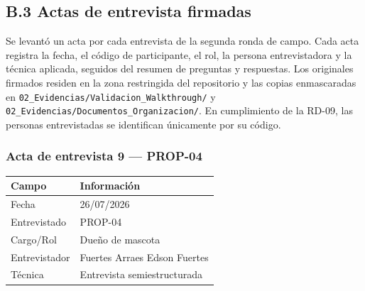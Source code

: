 \documentclass[journal,onecolumn]{IEEEtran}
\begin{document}
	
	\subsection*{B.3 Actas de entrevista firmadas}
	
	Se levantó un acta por cada entrevista de la segunda ronda de campo. Cada
	acta registra la fecha, el código de participante, el rol, la persona
	entrevistadora y la técnica aplicada, seguidos del resumen de preguntas y
	respuestas. Los originales firmados residen en la zona restringida del
	repositorio y las copias enmascaradas en
	\texttt{02\_Evidencias/Validacion\_Walkthrough/} y
	\texttt{02\_Evidencias/Documentos\_Organizacion/}. En cumplimiento de la
	RD-09, las personas entrevistadas se identifican únicamente por su código.
	
	
	\subsubsection*{Acta de entrevista 9 --- PROP-04}
	
	\begin{table}[H]
		\centering\small
		\begin{tabularx}{\textwidth}{@{}l X@{}}
			\toprule
			\textbf{Campo} & \textbf{Información} \\
			\midrule
			
			Fecha & 26/07/2026 \\
			
			Entrevistado & PROP-04 \\
			
			Cargo/Rol & Dueño de mascota \\
			
			Entrevistador & Fuertes Arraes Edson Fuertes \\
			
			Técnica & Entrevista semiestructurada \\
			
			\bottomrule
		\end{tabularx}
	\end{table}
	
\end{document}
